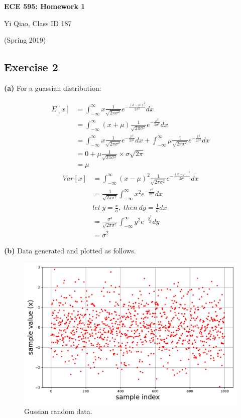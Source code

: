 \documentclass[11pt]{article}
\begin{document}
\begin{center}
\Large{\textbf{ECE 595: Homework 1}}

Yi Qiao, Class ID 187

(Spring 2019)
\end{center}


\subsection*{Exercise 2}
\noindent\textbf{(a)} For a guassian distribution:

\begin{equation} \label{eq1}
\begin{split}
E[x] &=\int_{-\infty}^{\infty}x\frac{1}{\sqrt{2\pi\sigma^2}}e^{-\frac{(x-\mu)^2}{2\sigma^2}}dx \\
	&=\int_{-\infty}^{\infty}(x+\mu)\frac{1}{\sqrt{2\pi\sigma^2}}e^{-\frac{x^2}{2\sigma^2}}dx \\
	&=\int_{-\infty}^{\infty}x\frac{1}{\sqrt{2\pi\sigma^2}}e^{-\frac{x^2}{2\sigma^2}}dx+\int_{-\infty}^{\infty}\mu\frac{1}{\sqrt{2\pi\sigma^2}}e^{-\frac{x^2}{2\sigma^2}}dx \\
	&=0+\mu\frac{1}{\sqrt{2\pi\sigma^2}}\times\sigma\sqrt{2\pi} \\
	&=\mu
\end{split}
\end{equation}
\begin{equation} \label{eq2}
\begin{split}
Var[x] &=\int_{-\infty}^{\infty}(x-\mu)^2\frac{1}{\sqrt{2\pi\sigma^2}}e^{-\frac{(x-\mu)^2}{2\sigma^2}}dx \\
	&=\frac{1}{\sqrt{2\pi\sigma^2}}\int_{-\infty}^{\infty}x^2e^{-\frac{x^2}{2\sigma^2}}dx \\
	&let\ y = \frac{x}{\sigma},\ then\ dy=\frac{1}{\sigma}dx \\
	&=\frac{\sigma^3}{\sqrt{2\pi\sigma^2}}\int_{-\infty}^{\infty}y^2e^{-\frac{y^2}{2}}dy \\
	&=\sigma^2
\end{split}
\end{equation}

\noindent\textbf{(b)} Data generated and plotted as follows.
\begin{figure}[h]
\centering
\includegraphics[width=0.5\linewidth]{exercise2_b}
\caption{Gussian random data.}
\label{fig: figure 1}
\end{figure}
\pagebreak
\end{document}
